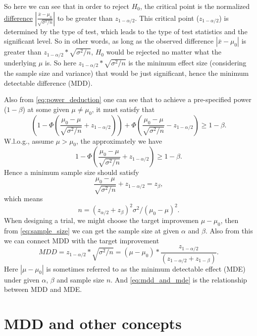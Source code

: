 \documentclass[a4paper,12pt]{article}
\begin{document}
So here we can see that in order to reject $H_0$, the critical point is the normalized \underline{difference} $\left|\frac{\bar{x} - \mu_0}{\sqrt{\sigma^2 / n}}\right|$ to be greater than $z_{1 - \alpha / 2}$. This critical point ($z_{1 - \alpha / 2}$) is determined by the type of test, which leads to the type of test statistics and the significant level. So in other words, as long as the observed difference $\left|\bar{x} - \mu_0\right|$ is greater than $z_{1 - \alpha / 2} * \sqrt{\sigma^2 / n}$, $H_0$ would be rejected no matter what the underlying $\mu$ is. So here $z_{1 - \alpha / 2} * \sqrt{\sigma^2 / n}$ is the minimum effect size (considering the sample size and variance) that would be just significant, hence the minimum detectable difference (MDD).
\par
Also from \eqref{eq:power_deduction} one can see that to achieve a pre-specified power ($1 - \beta$) at some given $\mu \neq \mu_0$, it must satisfy that
\[
  \left(
    1 - \Phi\left(
      \frac{\mu_0 - \mu}{\sqrt{\sigma^2 / n}}
      + z_{1 - \alpha / 2}
    \right)
  \right)
  + \Phi\left(
    \frac{\mu_0 - \mu}{\sqrt{\sigma^2 / n}}
    - z_{1 - \alpha / 2}
  \right)
  \geq
  1 - \beta
  .
\]
W.l.o.g., assume $\mu > \mu_0$, the approximately we have
\[
  1 - \Phi\left(
    \frac{\mu_0 - \mu}{\sqrt{\sigma^2 / n}}
    + z_{1 - \alpha / 2}
  \right)
  \geq 1 - \beta
  .
\]
Hence a minimum sample size should satisfy
\[
  \frac{\mu_0 - \mu}{\sqrt{\sigma^2 / n}}
  + z_{1 - \alpha / 2}
  =
  z_{\beta}
  ,
\]
which means
\begin{equation}
  \label{eq:sample_size}
    n = \left(z_{\alpha / 2} + z_\beta\right)^2\sigma^2 / \left(\mu_0 - \mu\right)^2
  .
\end{equation}
When designing a trial, we might choose the target improvemen $\mu - \mu_0$, then from \eqref{eq:sample_size} we can get the sample size at given $\alpha$ and $\beta$. Also from this we can connect MDD with the target improvement
\begin{equation}
  \label{eq:mdd_and_mde}
    MDD
  = z_{1 - \alpha / 2} * \sqrt{\sigma^2 / n}
  = \left(\mu - \mu_0\right) * \frac{z_{1 - \alpha / 2}}{\left(z_{1 - \alpha / 2} + z_{1 - \beta}\right)} 
  .
\end{equation}
Here $\left|\mu - \mu_0\right|$ is sometimes referred to as the minimum detectable effect (MDE) under given $\alpha$, $\beta$ and sample size $n$. And \eqref{eq:mdd_and_mde} is the relationship between MDD and MDE.

\section{MDD and other concepts}
\label{sec:mdd-other-concepts}
\end{document}
